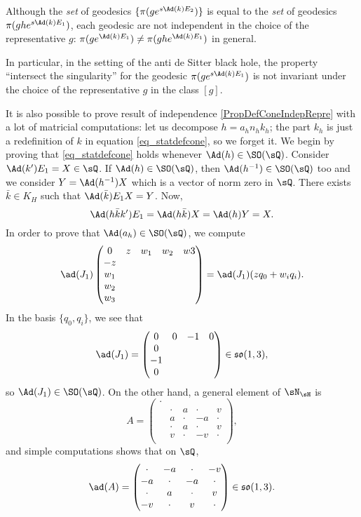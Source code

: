 \begin{remark}		\label{RemGedNonInvarChoix}
Although the \emph{set} of geodesics $\{ \pi(g e^{s\Ad(k)E_2}) \}$ is equal to the \emph{set} of geodesics $\pi(gh e^{s\Ad(k)E_1})$, each geodesic are not independent in the choice of the representative $g$: $\pi(g e^{\Ad(k)E_1})\neq\pi(gh e^{\Ad(k)E_1})$ in general.

In particular, in the setting of the anti de Sitter black hole, the property ``intersect the singularity'' for the geodesic $\pi(g e^{s\Ad(k)E_1})$ is not invariant under the choice of the representative $g$ in the class $[g]$.
\end{remark}

It is also possible to prove result of independence \ref{PropDefConeIndepRepre} with a lot of matricial computations: let us decompose $h=a_hn_hk_h$; the part $k_h$ is just a redefinition of $k$ in equation \eqref{eq_statdefcone}, so we forget it. We begin by proving that \eqref{eq_statdefcone} holds whenever $\Ad(h)\in \SO(\sQ)$. Consider $\Ad(k')E_1=X\in\sQ$. If $\Ad(h)\in \SO(\sQ)$, then $\Ad(h^{-1})\in \SO(\sQ)$ too and we consider $Y=\Ad(h^{-1})X$ which is a vector of norm zero in $\sQ$. There exists $\bar k\in K_H$ such that $\Ad(\bar k)E_1X=Y$. Now,
\begin{equation}
\Ad(h\bar kk')E_1=\Ad(h\bar k)X
		=\Ad(h)Y
		=X.
\end{equation}
In order to prove that $\Ad(a_h)\in \SO(\sQ)$, we compute
\[
  \ad(J_1)\begin{pmatrix}
0	& z	& w_1	& w_2	& w3\\
-z\\
w_1\\
w_2\\
w_3
\end{pmatrix}
=\ad(J_1)(zq_0+w_iq_i).
\]
In the basis $\{ q_0,q_i \}$, we see that
\[
  \ad(J_1)=\begin{pmatrix}
0&0&-1&0\\
0\\-1\\0
\end{pmatrix}\in\mathfrak{so}(1,3),
\]
so $\Ad(J_1)\in \SO(\sQ)$. On the other hand, a general element of $\sN_{\sH}$ is
\[
  A=\begin{pmatrix}
\cdot\\
&\cdot& a&\cdot& v\\
&a&\cdot &-a&\cdot\\
&  \cdot& a&\cdot& v\\
&v&\cdot&-v&\cdot\\
\end{pmatrix},
\]
and simple computations shows that on $\sQ$,
\[
  \ad(A)=\begin{pmatrix}
\cdot &-a&\cdot&-v\\
-a&\cdot&-a&\cdot\\
\cdot&a&\cdot &v\\
-v&\cdot&v&\cdot
\end{pmatrix}\in\mathfrak{so}(1,3).
\]


